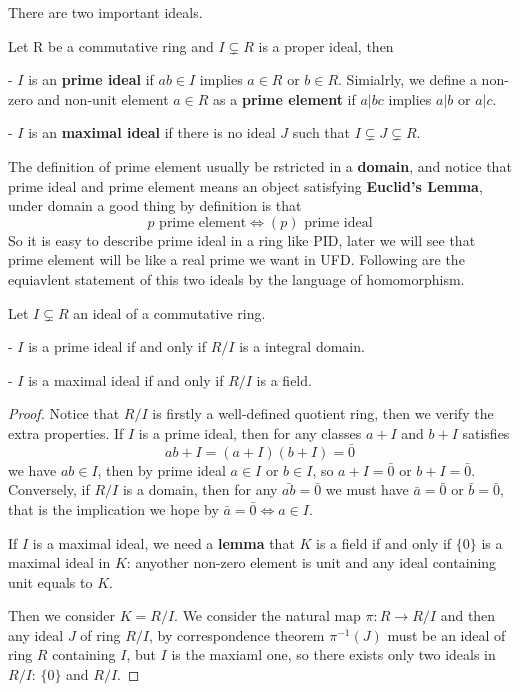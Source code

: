 \documentclass[en,geye,blue,normal,12pt]{elegantnote}
\begin{document}
There are two important ideals.

\begin{definition}
  Let R be a commutative ring and \(I \subsetneq R\) is a proper ideal, then

  - \(I\) is an \textbf{prime ideal} if  \(ab \in I \) implies \(a\in R\) or \(b \in R\). Simialrly, we define a non-zero and non-unit element \(a \in R\) as a \textbf{prime element} if \(a|bc\) implies \(a|b\) or \(a|c\).

  - \(I\) is an \textbf{maximal ideal} if there is no ideal \(J \) such that \(I \subsetneq J \subsetneq R\).
\end{definition}
The definition of prime element usually be rstricted in a \textbf{domain}, and notice that prime ideal and prime element means an object satisfying \textbf{Euclid's Lemma}, under domain a good thing by definition is that
\[p \text{ prime element} \iff (p) \text{ prime ideal}\]
So it is easy to describe prime ideal in a ring like PID, later we will see that prime element will be like a real prime we want in UFD.
Following are the equiavlent statement of this two ideals by the language of homomorphism. 

\begin{proposition}
  Let \(I \subsetneq R\) an ideal of a commutative ring.

  - \(I\) is a prime ideal if and only if \(R/I\) is a integral domain.

  - \(I\) is a maximal ideal if and only if \(R/I\) is a field.

  \begin{proof}
    Notice that \(R/I\) is firstly a well-defined quotient ring, then we verify the extra properties. If \(I\) is a prime ideal, then for any classes \(a+I\) and \(b+I\) satisfies 
    \[ab+I=(a+I)(b+I)= \bar{0}\]
    we have \(ab \in I\), then by prime ideal \(a \in I\) or \(b \in I\), so \(a+I = \bar{0}\) or \(b+I = \bar{0}\). Conversely, if \(R/I\) is a domain, then for any \(\bar{ab}=\bar{0}\) we must have \(\bar{a} = \bar{0}\) or \(\bar{b} = \bar{0}\), that is the implication we hope by \(\bar{a} = \bar{0} \iff a \in I\).

    If \(I\) is a maximal ideal, we need a \textbf{lemma} that \(K\) is a field if and only if \(\{0\}\) is a maximal ideal in \(K\): anyother non-zero element is unit and any ideal containing unit equals to \(K\).

    Then we consider \(K = R/I\). We consider the natural map \(\pi: R \to R/I\) and then any ideal \(J\) of ring \(R/I\), by correspondence theorem \(\pi^{-1}(J)\) must be an ideal of ring \(R\) containing \(I\), but \(I\) is the maxiaml one, so there exists only two ideals in \(R/I\): \(\{0\}\) and \(R/I\).
  \end{proof}
\end{proposition}
\end{document}
